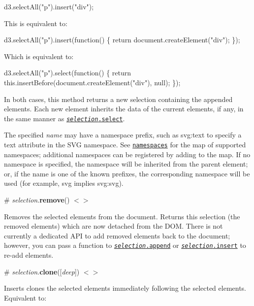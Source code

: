 \begin{DoxyCode}
d3.selectAll("p").insert("div");
\end{DoxyCode}


This is equivalent to\+:


\begin{DoxyCode}
d3.selectAll("p").insert(function() \{
  return document.createElement("div");
\});
\end{DoxyCode}


Which is equivalent to\+:


\begin{DoxyCode}
d3.selectAll("p").select(function() \{
  return this.insertBefore(document.createElement("div"), null);
\});
\end{DoxyCode}


In both cases, this method returns a new selection containing the appended elements. Each new element inherits the data of the current elements, if any, in the same manner as \href{#selection_select}{\tt {\itshape selection}.select}.

The specified {\itshape name} may have a namespace prefix, such as {\ttfamily svg\+:text} to specify a {\ttfamily text} attribute in the S\+VG namespace. See \href{#namespaces}{\tt namespaces} for the map of supported namespaces; additional namespaces can be registered by adding to the map. If no namespace is specified, the namespace will be inherited from the parent element; or, if the name is one of the known prefixes, the corresponding namespace will be used (for example, {\ttfamily svg} implies {\ttfamily svg\+:svg}).

\label{_selection_remove}%
\# {\itshape selection}.{\bfseries remove}() \href{https://github.com/d3/d3-selection/blob/master/src/selection/remove.js}{\tt $<$$>$}

Removes the selected elements from the document. Returns this selection (the removed elements) which are now detached from the D\+OM. There is not currently a dedicated A\+PI to add removed elements back to the document; however, you can pass a function to \href{#selection_append}{\tt {\itshape selection}.append} or \href{#selection_insert}{\tt {\itshape selection}.insert} to re-\/add elements.

\label{_selection_clone}%
\# {\itshape selection}.{\bfseries clone}(\mbox{[}{\itshape deep}\mbox{]}) \href{https://github.com/d3/d3-selection/blob/master/src/selection/clone.js}{\tt $<$$>$}

Inserts clones the selected elements immediately following the selected elements. Equivalent to\+:


